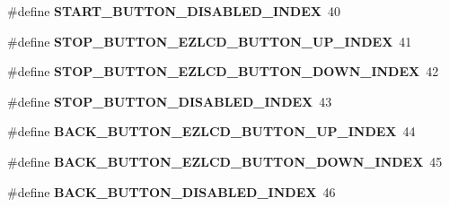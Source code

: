 \begin{DoxyCompactItemize}
\item 
\hypertarget{group__ez_l_c_d__103__user__config_gaa2acf04bb0a472bb92477490ec89f11f}{\#define {\bfseries S\-T\-A\-R\-T\-\_\-\-B\-U\-T\-T\-O\-N\-\_\-\-D\-I\-S\-A\-B\-L\-E\-D\-\_\-\-I\-N\-D\-E\-X}~40}\label{group__ez_l_c_d__103__user__config_gaa2acf04bb0a472bb92477490ec89f11f}

\item 
\hypertarget{group__ez_l_c_d__103__user__config_gae02e09e75900ebc76dfa7298d6e7b2bb}{\#define {\bfseries S\-T\-O\-P\-\_\-\-B\-U\-T\-T\-O\-N\-\_\-\-E\-Z\-L\-C\-D\-\_\-\-B\-U\-T\-T\-O\-N\-\_\-\-U\-P\-\_\-\-I\-N\-D\-E\-X}~41}\label{group__ez_l_c_d__103__user__config_gae02e09e75900ebc76dfa7298d6e7b2bb}

\item 
\hypertarget{group__ez_l_c_d__103__user__config_ga8c6cbb0579bd7b2655c0542562fd3e1d}{\#define {\bfseries S\-T\-O\-P\-\_\-\-B\-U\-T\-T\-O\-N\-\_\-\-E\-Z\-L\-C\-D\-\_\-\-B\-U\-T\-T\-O\-N\-\_\-\-D\-O\-W\-N\-\_\-\-I\-N\-D\-E\-X}~42}\label{group__ez_l_c_d__103__user__config_ga8c6cbb0579bd7b2655c0542562fd3e1d}

\item 
\hypertarget{group__ez_l_c_d__103__user__config_gaed7305edbda928d8531cfd50c1f86632}{\#define {\bfseries S\-T\-O\-P\-\_\-\-B\-U\-T\-T\-O\-N\-\_\-\-D\-I\-S\-A\-B\-L\-E\-D\-\_\-\-I\-N\-D\-E\-X}~43}\label{group__ez_l_c_d__103__user__config_gaed7305edbda928d8531cfd50c1f86632}

\item 
\hypertarget{group__ez_l_c_d__103__user__config_ga5b0f4358b10e1a66953ed63d901d0f7a}{\#define {\bfseries B\-A\-C\-K\-\_\-\-B\-U\-T\-T\-O\-N\-\_\-\-E\-Z\-L\-C\-D\-\_\-\-B\-U\-T\-T\-O\-N\-\_\-\-U\-P\-\_\-\-I\-N\-D\-E\-X}~44}\label{group__ez_l_c_d__103__user__config_ga5b0f4358b10e1a66953ed63d901d0f7a}

\item 
\hypertarget{group__ez_l_c_d__103__user__config_ga826bcc083eeaef76db2f11576c52a2b7}{\#define {\bfseries B\-A\-C\-K\-\_\-\-B\-U\-T\-T\-O\-N\-\_\-\-E\-Z\-L\-C\-D\-\_\-\-B\-U\-T\-T\-O\-N\-\_\-\-D\-O\-W\-N\-\_\-\-I\-N\-D\-E\-X}~45}\label{group__ez_l_c_d__103__user__config_ga826bcc083eeaef76db2f11576c52a2b7}

\item 
\hypertarget{group__ez_l_c_d__103__user__config_ga2a0f1113a2a20df55989f428dfeac069}{\#define {\bfseries B\-A\-C\-K\-\_\-\-B\-U\-T\-T\-O\-N\-\_\-\-D\-I\-S\-A\-B\-L\-E\-D\-\_\-\-I\-N\-D\-E\-X}~46}\label{group__ez_l_c_d__103__user__config_ga2a0f1113a2a20df55989f428dfeac069}


\end{DoxyCompactItemize}
